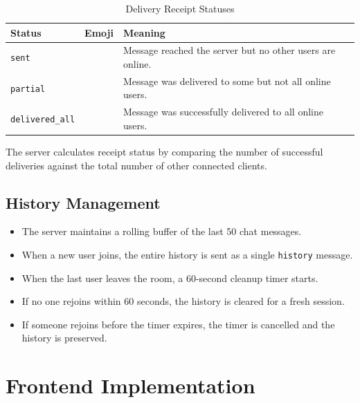 \documentclass[12pt, a4paper]{article}
\begin{document}
\begin{table}[H]
    \centering
    \caption{Delivery Receipt Statuses}
    \begin{tabularx}{\textwidth}{l l X}
        \toprule
        \textbf{Status} & \textbf{Emoji} & \textbf{Meaning} \\
        \midrule
        \texttt{sent}           & \raisebox{-0.1em}{\Large 😴} & Message reached the server but no other users are online. \\
        \texttt{partial}        & \raisebox{-0.1em}{\Large 😃} & Message was delivered to some but not all online users. \\
        \texttt{delivered\_all} & \raisebox{-0.1em}{\Large 😎} & Message was successfully delivered to all online users. \\
        \bottomrule
    \end{tabularx}
\end{table}

The server calculates receipt status by comparing the number of successful deliveries against the total number of other connected clients.

\subsection{History Management}

\begin{itemize}[leftmargin=*]
    \item The server maintains a rolling buffer of the last 50 chat messages.
    \item When a new user joins, the entire history is sent as a single \texttt{history} message.
    \item When the last user leaves the room, a 60-second cleanup timer starts.
    \item If no one rejoins within 60 seconds, the history is cleared for a fresh session.
    \item If someone rejoins before the timer expires, the timer is cancelled and the history is preserved.
\end{itemize}


\section{Frontend Implementation}
\end{document}
